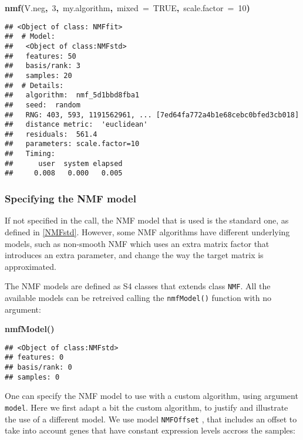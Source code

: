 \documentclass[a4paper]{article}\usepackage{graphicx, color}
\makeatletter
\newcommand{\hlnumber}[1]{\textcolor[rgb]{0,0,0}{#1}}%
\newcommand{\hlfunctioncall}[1]{\textcolor[rgb]{0.501960784313725,0,0.329411764705882}{\textbf{#1}}}%
\newcommand{\hlkeyword}[1]{\textcolor[rgb]{0,0,0}{\textbf{#1}}}%
\newcommand{\hlargument}[1]{\textcolor[rgb]{0.690196078431373,0.250980392156863,0.0196078431372549}{#1}}%
\newcommand{\hlsymbol}[1]{\textcolor[rgb]{0,0,0}{#1}}%
\newcommand{\hlstd}[1]{\textcolor[rgb]{0,0,0}{#1}}%
\newenvironment{kframe}{%
 \def\FrameCommand##1{\hskip\@totalleftmargin \hskip-\fboxsep
 \colorbox{shadecolor}{##1}\hskip-\fboxsep
     \hskip-\linewidth \hskip-\@totalleftmargin \hskip\columnwidth}%
 \MakeFramed {\advance\hsize-\width
   \@totalleftmargin\z@ \linewidth\hsize
   \@setminipage}}%
 {\par\unskip\endMakeFramed}
\newenvironment{knitrout}{}{} %
\let\code=\texttt
\makeatother
\begin{document}
\begin{knitrout}
\begin{kframe}
\begin{flushleft}
\hlstd{}\hlfunctioncall{nmf}\hlkeyword{(}\hlsymbol{V.neg}\hlkeyword{,}{\ }\hlnumber{3}\hlkeyword{,}{\ }\hlsymbol{my.algorithm}\hlkeyword{,}{\ }\hlargument{mixed}{\ }\hlargument{=}{\ }\hlnumber{TRUE}\hlkeyword{,}{\ }\hlargument{scale.factor}{\ }\hlargument{=}{\ }\hlnumber{10}\hlkeyword{)}\mbox{}
\normalfont
\end{flushleft}
\begin{verbatim}
## <Object of class: NMFfit>
##  # Model:
##   <Object of class:NMFstd>
##   features: 50 
##   basis/rank: 3 
##   samples: 20 
##  # Details:
##   algorithm:  nmf_5d1bbd8fba1 
##   seed:  random 
##   RNG: 403, 593, 1191562961, ... [7ed64fa772a4b1e68cebc0bfed3cb018]
##   distance metric:  'euclidean' 
##   residuals:  561.4 
##   parameters: scale.factor=10 
##   Timing:
##      user  system elapsed 
##     0.008   0.000   0.005 
\end{verbatim}
\end{kframe}
\end{knitrout}


\subsubsection{Specifying the NMF model}
If not specified in the call, the NMF model that is used is the standard one, as defined in \cref{NMFstd}. 
However, some NMF algorithms have different underlying models, such as non-smooth NMF \cite{Pascual-Montano2006} which uses an extra matrix factor that introduces an extra parameter, and change the way the target matrix is approximated.

The NMF models are defined as S4 classes that extends class \code{NMF}. All the available models can be retreived calling the \code{nmfModel()} function with no 
argument:

\begin{knitrout}
\color{fgcolor}\begin{kframe}
\begin{flushleft}
\ttfamily\noindent
\hlfunctioncall{nmfModel}\hlkeyword{(}\hlkeyword{)}\mbox{}
\normalfont
\end{flushleft}
\begin{verbatim}
## <Object of class:NMFstd>
## features: 0 
## basis/rank: 0 
## samples: 0 
\end{verbatim}
\end{kframe}
\end{knitrout}

 
One can specify the NMF model to use with a custom algorithm, using argument \code{model}. Here we first adapt a bit the custom algorithm, to justify and illustrate the use of a different model.
We use model \code{NMFOffset} \cite{Badea2008}, that includes an offset to take into account genes that have constant expression levels accross the samples:
\end{document}
